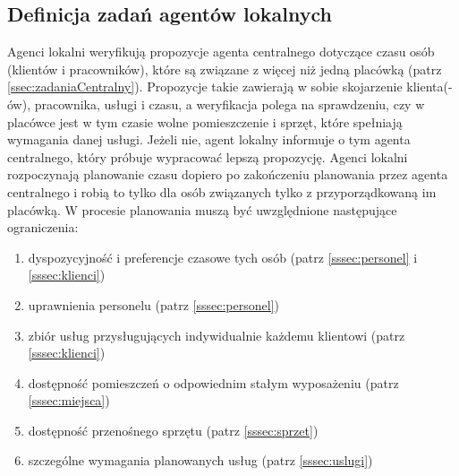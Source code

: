\subsection{Definicja zadań agentów lokalnych}\label{ssec:zadaniaLokalny}
Agenci lokalni weryfikują propozycje agenta centralnego dotyczące czasu osób (klientów
i pracowników), które są związane z więcej niż jedną placówką (patrz \ref{ssec:zadaniaCentralny}).
Propozycje takie zawierają w sobie skojarzenie klienta(-ów), pracownika, usługi i czasu,
a weryfikacja polega na sprawdzeniu, czy w placówce jest w tym czasie wolne pomieszczenie i sprzęt,
które spełniają wymagania danej usługi. Jeżeli nie, agent lokalny informuje o tym agenta centralnego,
który próbuje wypracować lepszą propozycję.
Agenci lokalni rozpoczynają planowanie czasu dopiero po zakończeniu planowania przez
agenta centralnego i robią to tylko dla osób związanych tylko z przyporządkowaną im placówką.
W procesie planowania muszą być uwzględnione następujące ograniczenia:
\begin{enumerate}
	\item{dyspozycyjność i preferencje czasowe tych osób (patrz \ref{sssec:personel} i \ref{sssec:klienci})}
	\item{uprawnienia personelu (patrz \ref{sssec:personel})}
	\item{zbiór usług przysługujących indywidualnie każdemu klientowi (patrz \ref{sssec:klienci})}
	\item{dostępność pomieszczeń o odpowiednim stałym wyposażeniu (patrz \ref{sssec:miejsca})}
	\item{dostępność przenośnego sprzętu (patrz \ref{sssec:sprzet})}
	\item{szczególne wymagania planowanych usług (patrz \ref{sssec:uslugi})}
\end{enumerate}

